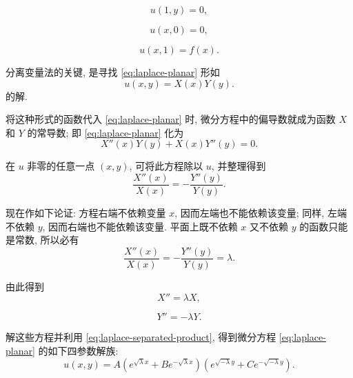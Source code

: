 \begin{equation}\label{eq:square-right-boundary}
u(1,y)=0,
\end{equation}

\begin{equation}\label{eq:square-bottom-boundary}
u(x,0)=0,
\end{equation}

\begin{equation}\label{eq:square-top-boundary}
u(x,1)=f(x).
\end{equation}


分离变量法的关键, 是寻找 \eqref{eq:laplace-planar} 形如
\begin{equation}\label{eq:laplace-separated-product}
u(x,y)=X(x)Y(y).
\end{equation}
的解.

将这种形式的函数代入 \eqref{eq:laplace-planar} 时, 微分方程中的偏导数就成为函数 $X$ 和 $Y$ 的常导数; 即 \eqref{eq:laplace-planar} 化为
\begin{equation}\label{eq:laplace-product-substitution}
X''(x)Y(y)+X(x)Y''(y)=0.
\end{equation}


在 $u$ 非零的任意一点 $(x,y)$, 可将此方程除以 $u$, 并整理得到
\begin{equation}\label{eq:laplace-separated-ratios}
\dfrac{X''(x)}{X(x)}=-\dfrac{Y''(y)}{Y(y)}.
\end{equation}


现在作如下论证: 方程右端不依赖变量 $x$, 因而左端也不能依赖该变量; 同样, 左端不依赖 $y$, 因而右端也不能依赖该变量. 平面上既不依赖 $x$ 又不依赖 $y$ 的函数只能是常数, 所以必有
\begin{equation}\label{eq:laplace-separation-constant}
\dfrac{X''(x)}{X(x)}=-\dfrac{Y''(y)}{Y(y)}=\lambda.
\end{equation}


由此得到
\begin{equation}\label{eq:laplace-separated-x-equation}
X''=\lambda X,
\end{equation}

\begin{equation}\label{eq:laplace-separated-y-equation}
Y''=-\lambda Y.
\end{equation}


解这些方程并利用 \eqref{eq:laplace-separated-product}, 得到微分方程 \eqref{eq:laplace-planar} 的如下四参数解族:
\begin{equation}\label{eq:laplace-four-parameter-family}
u(x,y)=A\left(e^{\sqrt{\lambda}x}+Be^{-\sqrt{\lambda}x}\right)\left(e^{\sqrt{-\lambda}y}+Ce^{-\sqrt{-\lambda}y}\right).
\end{equation}


